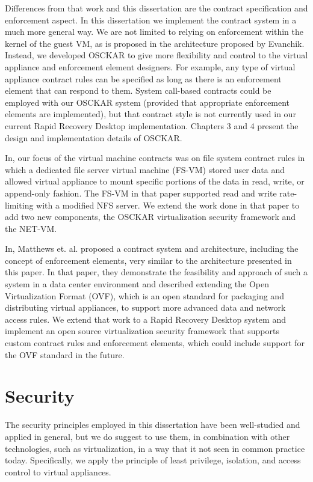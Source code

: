 Differences from that work and this dissertation are the contract specification and enforcement aspect. In this dissertation we implement the contract system in a much more general way. We are not limited to relying on enforcement within the kernel of the guest VM, as is proposed in the architecture proposed by Evanchik\cite{evanchik_thesis_2004}. Instead, we developed OSCKAR to give more flexibility and control to the virtual appliance and enforcement element designers. For example, any type of virtual appliance contract rules can be specified as long as there is an enforcement element that can respond to them. System call-based contracts could be employed with our OSCKAR system (provided that appropriate enforcement elements are implemented), but that contract style is not currently used in our current Rapid Recovery Desktop implementation. Chapters 3 and 4 present the design and implementation details of OSCKAR.

In\cite{rapid_recovery_paper_05}, our focus of the virtual machine contracts was on file system contract rules in which a dedicated file server virtual machine (FS-VM) stored user data and allowed virtual appliance to mount specific portions of the data in read, write, or append-only fashion. The FS-VM in that paper supported read and write rate-limiting with a modified NFS server. We extend the work done in that paper to add two new components, the OSCKAR virtualization security framework and the NET-VM.

In\cite{virtual_machine_contract_ICAC09}, Matthews et. al. proposed a contract system and architecture, including the concept of enforcement elements, very similar to the architecture presented in this paper. In that paper, they demonstrate the feasibility and approach of such a system in a data center environment and described extending the Open Virtualization Format (OVF)\cite{dmtf_newsletter}, which is an open standard for packaging and distributing virtual appliances, to support more advanced data and network access rules. We extend that work to a Rapid Recovery Desktop system and implement an open source virtualization security framework that supports custom contract rules and enforcement elements, which could include support for the OVF standard in the future.

\section{Security}

The security principles employed in this dissertation have been well-studied and applied in general, but we do suggest to use them, in combination with other technologies, such as virtualization, in a way that it not seen in common practice today. Specifically, we apply the principle of least privilege, isolation, and access control to virtual appliances.

